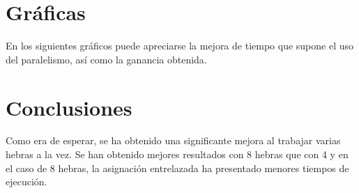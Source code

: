 \documentclass[12pt,spanish]{article}
\begin{document}
\section{Gráficas}
En los siguientes gráficos puede apreciarse la mejora de tiempo que
supone el uso del paralelismo, así como la ganancia obtenida.

\begin{figure}[H]
  \centering
\end{figure}

\begin{figure}[H]
  \centering
\end{figure}

\section{Conclusiones}
Como era de esperar, se ha obtenido una significante mejora al
trabajar varias hebras a la vez. Se han obtenido mejores resultados
con 8 hebras que con 4 y en el caso de 8 hebras, la asignación
entrelazada ha presentado menores tiempos de ejecución.
\end{document}
